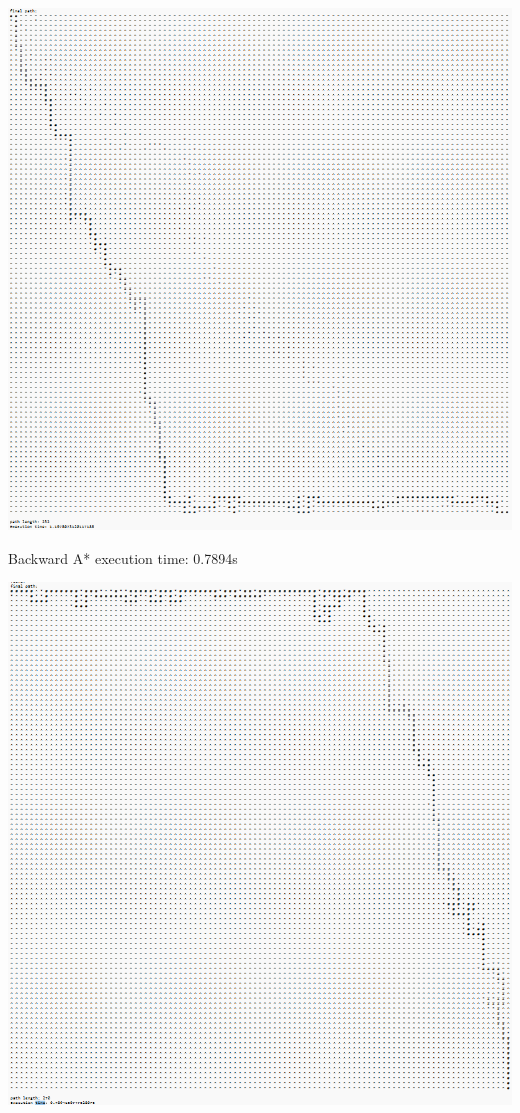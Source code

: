 \documentclass[12pt, letterpaper]{article}
\begin{document}
\includegraphics[width=\textwidth,height=\textheight]{part3a.png}

Backward A* execution time: 0.7894s

\includegraphics[width=\textwidth,height=\textheight]{part3b.png}
\end{document}

